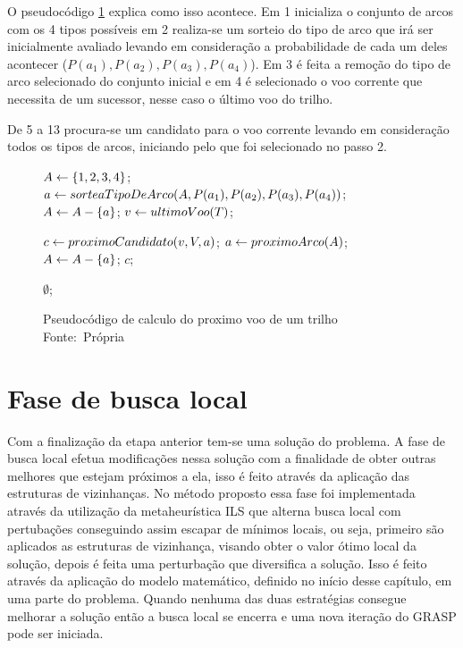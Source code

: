 O pseudocódigo \ref{alg:calcvoo} explica como isso acontece. Em 1 inicializa o
conjunto de arcos com os 4 tipos possíveis em 2 realiza-se um sorteio do tipo de
arco que irá ser inicialmente avaliado levando em consideração a probabilidade
de cada um deles acontecer ($P(a_{1}), P(a_{2}), P(a_{3}), P(a_{4})$). Em 3 é
feita a remoção do tipo de arco selecionado do conjunto inicial e em 4
é selecionado o voo corrente que necessita de um sucessor, nesse caso o último
voo do trilho.

De 5 a 13 procura-se um candidato para o voo corrente levando em consideração
todos os tipos de arcos, iniciando pelo que foi selecionado no passo 2.

\begin{figure}[h]
\caption{Pseudocódigo de calculo do proximo voo de um trilho
\newline
\mbox{Fonte: Própria}}\label{alg:calcvoo}
\begin{programma}

\STATE $A \leftarrow \{1,2,3,4\}$;
\STATE $a \leftarrow sorteaTipoDeArco(A, P(a_{1}),P(a_{2}),P(a_{3}),P(a_{4}))$;
\STATE $A \leftarrow A - \{a\}$; \STATE $v \leftarrow ultimoVoo(T)$;

\STATE $c \leftarrow proximoCandidato(v, V, a)$;
	\STATE $a \leftarrow proximoArco(A)$;
	\STATE $A \leftarrow A - \{a\}$;
\ELSE
	\STATE\RETURN $c$;
\ENDIF 
\ENDFOR

\STATE\RETURN $\emptyset$;

\ENDALGORITHM
\end{programma}
\end{figure}
 
 \section{Fase de busca local}

Com a finalização da etapa anterior tem-se uma solução do problema. A fase de busca
local efetua modificações nessa solução com a finalidade de obter outras
melhores que estejam próximos a ela, isso é feito através da aplicação das
estruturas de vizinhanças. No método proposto essa fase foi implementada através
da utilização da metaheurística ILS que alterna busca local com pertubações
conseguindo assim escapar de mínimos locais, ou seja, primeiro são aplicados as
estruturas de vizinhança, visando obter o valor ótimo local da solução, depois
é feita uma perturbação que diversifica a solução. Isso é feito através da
aplicação do modelo matemático, definido no início desse capítulo, em uma parte
do problema. Quando nenhuma das duas estratégias consegue melhorar a solução
então a busca local se encerra e uma nova iteração do GRASP pode ser iniciada.
 
